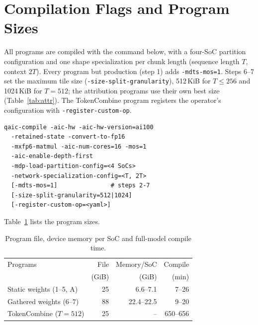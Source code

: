 \section{Compilation Flags and Program Sizes}
\label{app:flags}

All programs are compiled with the command below, with a four-SoC partition configuration and one shape specialization
per chunk length (sequence length $T$, context $2T$). Every program but production (step 1) adds \texttt{-mdts-mos=1}.
Steps 6--7 set the maximum tile size (\texttt{-size-split-granularity}), 512\,KiB for $T\le256$ and 1024\,KiB for $T=512$;
the attribution programs use their own best size (Table~\ref{tab:attr}). The TokenCombine program registers the operator's
configuration with \texttt{-register-custom-op}.
{\footnotesize
\begin{verbatim}
qaic-compile -aic-hw -aic-hw-version=ai100
  -retained-state -convert-to-fp16
  -mxfp6-matmul -aic-num-cores=16 -mos=1
  -aic-enable-depth-first
  -mdp-load-partition-config=<4 SoCs>
  -network-specialization-config=<T, 2T>
  [-mdts-mos=1]               # steps 2-7
  [-size-split-granularity=512|1024]
  [-register-custom-op=<yaml>]
\end{verbatim}}
\noindent Table~\ref{tab:sizes} lists the program sizes.

\begin{table}[H]
\caption{Program file, device memory per SoC and full-model compile time.}
\label{tab:sizes}
\vskip 0.1in
\begin{center}
\begin{footnotesize}
\setlength{\tabcolsep}{3pt}
\begin{tabular}{@{}lrrr@{}}
\toprule
Programs & File & Memory/SoC & Compile \\
 & (GiB) & (GiB) & (min) \\
\midrule
Static weights (1--5, A)  & 25 & 6.6--7.1 & 7--26 \\
Gathered weights (6--7)   & 88 & 22.4--22.5 & 9--20 \\
TokenCombine ($T=512$)    & 25 & -- & 650--656 \\
\bottomrule
\end{tabular}
\end{footnotesize}
\end{center}
\end{table}
